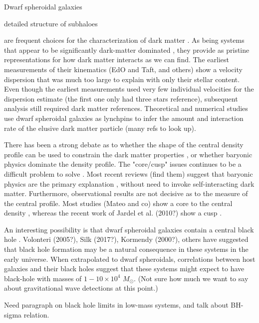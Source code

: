 \documentclass[%
 aip,
 twocolumn,
 jmp,%
 amsmath,amssymb,
 reprint,%
]{aastex61}
\newcommand{\Msun}{$M_{\odot}$}
\begin{document}




Dwarf spheroidal galaxies 

detailed structure of subhaloes

are frequent choices for the
characterization of dark matter . As being systems that appear to be
significantly dark-matter dominated , they provide as pristine
representations for how dark matter interacts as we can find. The
earliest measurements of their kinematics (EdO and Taft, and others) show
a velocity dispersion that was much too large to explain with only their stellar content. Even though the earliest measurements used very few individual velocities for the
dispersion estimate (the first one only had three stars {reference}), subsequent
analysis still required dark matter {references}. Theoretical and numerical 
studies use dwarf spheroidal galaxies as lynchpins to infer the amount and
interaction rate of the elusive dark matter particle (many refs to look
up).

There has been a strong debate as to whether the shape of the central density
profile can be used to constrain the dark matter properties , or
whether baryonic physics dominate the density profile. The "core/cusp"
issues continues to be a difficult problem to solve . Most recent
reviews (find them) suggest that baryonic physics are the primary
explanation , without need to invoke self-interacting dark
matter. Furthermore, observational results are not decisive as to the
measure  of the central profile. Most studies (Mateo and co) show a
core to the central density , whereas the recent work of Jardel et
al. (2010?) show a cusp .

An interesting possibility is that dwarf spheroidal galaxies contain a
central black hole . Volonteri (2005?), Silk (2017?), Kormendy (2000?),
others have suggested that black hole formation may be a natural
consequence in these systems in the early universe. When extrapolated
to dwarf spheroidals, correlations between host galaxies and their
black holes suggest that these systems might expect to have black-hole
with masses of $1-10\times10^4$ \Msun. (Not sure how much we want to say
about gravitational wave detections at this point.)

Need paragraph on black hole limits in low-mass systems, and talk about BH-sigma relation.
\end{document}
